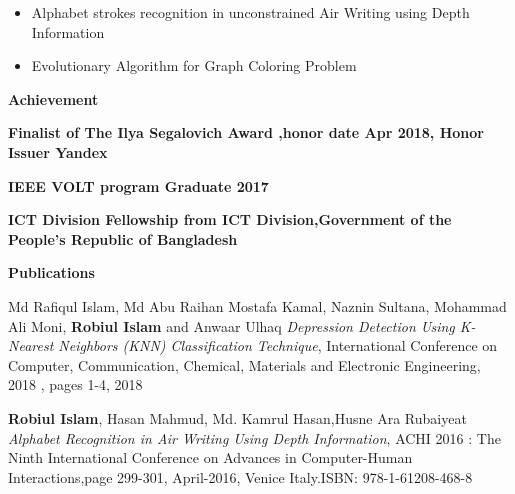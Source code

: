 \documentclass[letterpaper,10pt]{article}
\newcommand{\resitem}[1]{\item #1 \vspace{-2pt}}
\newcommand{\resheading}[1]{{\large \colorbox{mygrey}{\begin{minipage}{\textwidth}{\textbf{#1 \vphantom{p\^{E}}}}\end{minipage}}}}
\begin{document}
\begin{itemize}
\resitem{Alphabet strokes recognition in unconstrained Air Writing using Depth Information}
\resitem{Evolutionary Algorithm for Graph Coloring Problem}
\end{itemize}

\resheading{Achievement}
\begin{description}
	\item \textbf{Finalist of The Ilya Segalovich Award ,honor date Apr 2018, Honor Issuer Yandex}
	\item \textbf{IEEE VOLT program Graduate 2017}
\item \textbf{ICT Division Fellowship from ICT Division,Government of the People's Republic of Bangladesh}
\end{description}




\resheading{Publications}

\begin{thebibliography}{}

\bibitem{}
Md Rafiqul Islam, Md Abu Raihan Mostafa Kamal, Naznin Sultana, Mohammad Ali Moni, \textbf{Robiul Islam} and Anwaar Ulhaq \emph{Depression Detection Using K-Nearest Neighbors (KNN) Classification Technique}, International Conference on Computer, Communication, Chemical, Materials and Electronic Engineering, 2018 , pages 1-4, 2018  

\bibitem{}
\textbf{Robiul Islam}, Hasan Mahmud, Md. Kamrul Hasan,Husne Ara Rubaiyeat \emph{Alphabet Recognition in Air Writing Using Depth Information}, ACHI 2016 : The Ninth International Conference on Advances in Computer-Human Interactions,page 299-301, April-2016, Venice Italy.ISBN: 978-1-61208-468-8

\end{thebibliography}
\end{document}
